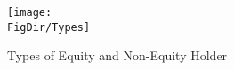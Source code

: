 \begin{figure}[ht]
  \centerline{
    \texttt{[image: \\FigDir/Types]}
  }
  \caption{Types of Equity and Non-Equity Holder} \label{fig:Timeline}
\end{figure}
